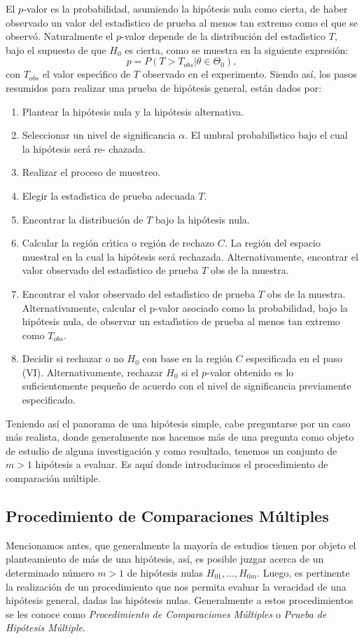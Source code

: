\documentclass{article}
\theoremstyle{definition}
\begin{document}
El $p$-valor es la probabilidad, asumiendo la hipótesis nula como cierta, de haber observado un valor
del estadı́stico de prueba al menos tan extremo como el que se observó. Naturalmente el $p$-valor
depende de la distribución del estadı́stico $T$, bajo el supuesto de que $H_0$ es cierta, como se muestra en la siguiente expresión:
\begin{equation*}
	p=P(T>T_{obs}|\theta\in\Theta_0),
\end{equation*}
con $T_{obs}$ el valor especı́fico de $T$ observado en el experimento.
Siendo así, los pasos resumidos para realizar una prueba de hipótesis general, están dados por:
\begin{enumerate}[I]
	\item Plantear la hipótesis nula y la hipótesis alternativa.
	\item Seleccionar un nivel de significancia $\alpha$. El umbral probabilı́stico bajo el cual la hipótesis será re-
	chazada.
	\item Realizar el proceso de muestreo.
	\item Elegir la estadı́stica de prueba adecuada $T$.
	\item Encontrar la distribución de $T$ bajo la hipótesis nula.
	\item Calcular la región crı́tica o región de rechazo $C$. La región del espacio muestral en la cual la
	hipótesis será rechazada. Alternativamente, encontrar el valor observado del estadı́stico de prueba $T$ obs de la muestra.
	\item Encontrar el valor observado del estadı́stico de prueba $T$ obs de la muestra. Alternativamente, calcular el p-valor asociado como la probabilidad, bajo la hipótesis nula, de observar un estadı́stico
	de prueba al menos tan extremo como $T_{obs}$.
	\item Decidir si rechazar o no $H_0$ con base en la región $C$ especificada en el paso (VI). Alternativamente, rechazar $H_0$ si el $p$-valor obtenido es lo suficientemente pequeño de acuerdo con el nivel de significancia previamente especificado.
\end{enumerate}
Teniendo así el panorama de una hipótesis simple, cabe preguntarse por un caso más realista, donde generalmente nos hacemos más de una pregunta como objeto de estudio de alguna investigación y como resultado, tenemos un conjunto de $m>1$ hipótesis a evaluar. Es aquí donde introducimos el procedimiento de comparación múltiple.

\subsection{Procedimiento de Comparaciones Múltiples}
Mencionamos antes, que generalmente la mayoría de estudios tienen por objeto el planteamiento de más de una hipótesis, así, es posible juzgar acerca de un determinado número $m>1$ de hipótesis nulas $H_{01},\dots,H_{0m}$. Luego, es pertinente la realización de un procedimiento que nos permita evaluar la veracidad de una hipótesis general, dadas las hipótesis nulas. Generalmente a estos procedimientos se les conoce como \textit{Procedimiento de Comparaciones Múltiples} o \textit{Prueba de Hipótesis Múltiple}.
\end{document}
